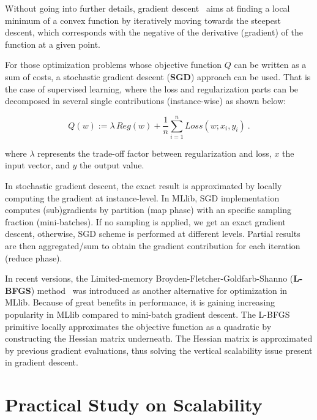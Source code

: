 \documentclass[3p,review]{elsarticle}
\begin{document}
Without going into further details, gradient descent~\cite{hastie11} aims at finding a local minimum of a convex function by iteratively moving towards the steepest descent, which corresponds with the negative of the derivative (gradient) of the function at a given point. 

For those optimization problems whose objective function $Q$ can be written as a sum of costs, a stochastic gradient descent (\textbf{SGD}) approach can be used. That is the case of supervised learning, where the loss and regularization parts can be decomposed in several single contributions (instance-wise) as shown below:

\begin{equation}
    Q(w) := 
    \lambda\, Reg(w) +
    \frac1n \sum_{i=1}^n Loss(w;x_i,y_i) 
    \label{eq:regPrimal}
    \ .
\end{equation}

\indent where $\lambda$ represents the trade-off factor between regularization and loss, $x$ the input vector, and $y$ the output value.

In stochastic gradient descent, the exact result is approximated by locally computing the gradient at instance-level. In MLlib, SGD implementation computes (sub)gradients by partition (map phase) with an specific sampling fraction (mini-batches). If no sampling is applied, we get an exact gradient descent, otherwise, SGD scheme is performed at different levels. Partial results are then aggregated/sum to obtain the gradient contribution for each iteration (reduce phase).  

In recent versions, the Limited-memory Broyden-Fletcher-Goldfarb-Shanno (\textbf{L-BFGS}) method~\cite{liu89} was introduced as another alternative for optimization in MLlib. Because of great benefits in performance, it is gaining increasing popularity in MLlib compared to mini-batch gradient descent. The L-BFGS primitive locally approximates the objective function as a quadratic by constructing the Hessian matrix underneath. The Hessian matrix is approximated by previous gradient evaluations, thus solving the vertical scalability issue present in gradient descent.




\section{Practical Study on Scalability}\label{sec:exp}
\end{document}
